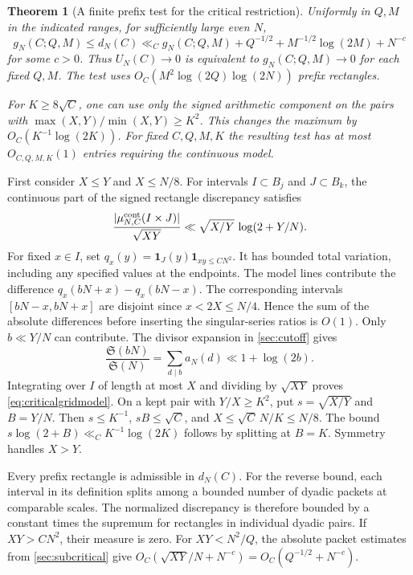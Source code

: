 \documentclass[11pt,a4paper]{article}
\numberwithin{equation}{section}
\newtheorem{theorem}{Theorem}[section]
\newcommand{\SSS}{\mathfrak S}
\begin{document}
\begin{theorem}[A finite prefix test for the critical restriction]
\label{thm:criticalgrid}
Uniformly in $Q,M$ in the indicated ranges, for sufficiently
large even $N$,
\begin{equation}
  g_N(C;Q,M)\le d_N(C)
   \ll_C g_N(C;Q,M)+Q^{-1/2}
       + M^{-1/2}\log(2M)+N^{-c}
  \label{eq:criticalgridcomparison}
\end{equation}
for some $c>0$. Thus $U_N(C)\to0$ is equivalent to
$g_N(C;Q,M)\to0$ for each fixed $Q,M$. The test uses
$O_C(M^2\log(2Q)\log(2N))$ prefix rectangles.

For $K\ge8\sqrt C$, one can use only the signed arithmetic
component on the pairs with $\max(X,Y)/\min(X,Y)\ge K^2$.
This changes the maximum by
$O_C(K^{-1}\log(2K))$. For fixed $C,Q,M,K$ the resulting
test has at most $O_{C,Q,M,K}(1)$ entries requiring the
continuous model.
\end{theorem}

First consider $X\le Y$ and $X\le N/8$. For intervals
$I\subset B_j$ and $J\subset B_k$, the continuous part of
the signed rectangle discrepancy satisfies
\begin{equation}
 \frac{|\mu_{N,C}^{\rm cont}(I\times J)|}{\sqrt{XY}}
      \ll \sqrt{X/Y}\,\log(2+Y/N).
 \label{eq:criticalgridmodel}
\end{equation}
For fixed $x\in I$, set $q_x(y)=\mathbf1_J(y)
\mathbf1_{xy\le CN^2}$. It has bounded total variation,
including any specified values at the endpoints.
The model lines contribute the difference
$q_x(bN+x)-q_x(bN-x)$. The corresponding intervals
$[bN-x,bN+x]$ are disjoint since $x<2X\le N/4$.
Hence the sum of the absolute differences before inserting
the singular-series ratios is $O(1)$. Only $b\ll Y/N$
can contribute. The divisor expansion in \cref{sec:cutoff}
gives
\[
  \frac{\SSS(bN)}{\SSS(N)}
       =\sum_{d\mid b}a_N(d)
       \ll 1+\log(2b).
\]
Integrating over $I$ of length at most $X$ and dividing
by $\sqrt{XY}$ proves \cref{eq:criticalgridmodel}. On
a kept pair with $Y/X\ge K^2$, put $s=\sqrt{X/Y}$ and
$B=Y/N$. Then $s\le K^{-1}$, $sB\le\sqrt C$, and
$X\le\sqrt C\,N/K\le N/8$. The bound
$s\log(2+B)\ll_C K^{-1}\log(2K)$ follows by splitting
at $B=K$. Symmetry handles $X>Y$.

Every prefix rectangle is admissible in $d_N(C)$. For
the reverse bound, each interval in its definition splits
among a bounded number of dyadic packets at comparable
scales. The normalized discrepancy is therefore bounded
by a constant times the supremum for rectangles in individual
dyadic pairs. If $XY>CN^2$, their measure is zero.
For $XY<N^2/Q$, the absolute packet estimates from
\cref{sec:subcritical} give
$O_C(\sqrt{XY}/N+N^{-c})=O_C(Q^{-1/2}+N^{-c})$.
\end{document}
